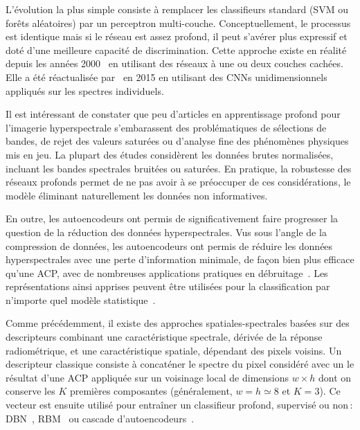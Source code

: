 L'évolution la plus simple consiste à remplacer les classifieurs standard (\gls{SVM} ou forêts aléatoires) par un perceptron multi-couche. Conceptuellement, le processus est identique mais si le réseau est assez profond, il peut s'avérer plus expressif et doté d'une meilleure capacité de discrimination. Cette approche existe en réalité depuis les années 2000~\cite{goel_classification_2003,ratle_semisupervised_2010} en utilisant des réseaux à une ou deux couches cachées. Elle a été réactualisée par~\citet{hu_deep_2015} en 2015 en utilisant des \glspl{CNN} unidimensionnels appliqués sur les spectres individuels.

Il est intéressant de constater que peu d'articles en apprentissage profond pour l'imagerie hyperspectrale s'embarassent des problématiques de sélections de bandes, de rejet des valeurs saturées ou d'analyse fine des phénomènes physiques mis en jeu. La plupart des études considèrent les données brutes normalisées, incluant les bandes spectrales bruitées ou saturées. En pratique, la robustesse des réseaux profonds permet de ne pas avoir à se préoccuper de ces considérations, le modèle éliminant naturellement les données non informatives.

En outre, les autoencodeurs ont permis de significativement faire progresser la question de la réduction des données hyperspectrales. Vus sous l'angle de la compression de données, les autoencodeurs ont permis de réduire les données hyperspectrales avec une perte d'information minimale, de façon bien plus efficace qu'une \gls{ACP}, avec de nombreuses applications pratiques en débruitage~\cite{xing_stacked_2015}. Les représentations ainsi apprises peuvent être utilisées pour la classification par n'importe quel modèle statistique~\cite{fu_semi-supervised_2016}.

Comme précédemment, il existe des approches spatiales-spectrales basées sur des descripteurs combinant une caractéristique spectrale, dérivée de la réponse radiométrique, et une caractéristique spatiale, dépendant des pixels voisins. Un descripteur classique consiste à concaténer le spectre du pixel considéré avec un le résultat d'une \gls{ACP} appliquée sur un voisinage local de dimensions $w\times h$ dont on conserve les $K$ premières composantes (généralement, $w = h \simeq 8$ et $K = 3$). Ce vecteur est ensuite utilisé pour entraîner un classifieur profond, supervisé ou non\,: \gls{DBN}~\cite{li_classification_2014,chen_spectral-spatial_2015}, \gls{RBM}~\cite{lin_spectral-spatial_2013,midhun_deep_2014} ou cascade d'autoencodeurs~\cite{chen_deep_2014,ma_spectral-spatial_2016,tao_unsupervised_2015,wang_spectralspatial_2017}.

